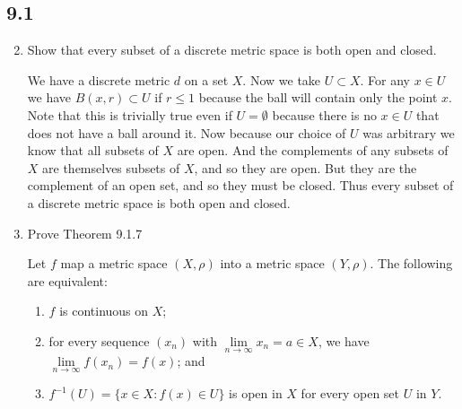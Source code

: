 \documentclass[letterpaper]{article}
\begin{document}
\renewcommand{\labelenumi}{\Alph{enumi}.}
\renewcommand{\labelenumii}{(\alph{enumii})}
\subsection*{9.1}
\begin{enumerate}
\setcounter{enumi}{1}
\item
Show that every subset of a discrete metric space is both open and closed.

We have a discrete metric $d$ on a set $X$. Now we take $U\subset X$. For any $x\in U$ we have $B(x,r)\subset U$ if $r\le 1$ because the ball will contain only the point $x$. Note that this is trivially true even if $U=\emptyset$ because there is no $x\in U$ that does not have a ball around it. Now because our choice of $U$ was arbitrary we know that all subsets of $X$ are open. And the complements of any subsets of $X$ are themselves subsets of $X$, and so they are open. But they are the complement of an open set, and so  they must be closed. Thus every subset of a discrete metric space is both open and closed.
\setcounter{enumi}{3}
\item
Prove Theorem 9.1.7

Let $f$ map a metric space $(X,\rho)$ into a metric space $(Y,\rho)$. The
following are equivalent:
\renewcommand{\labelenumii}{(\arabic{enumii})}
  \begin{enumerate}
    \item
    $f$ is continuous on $X$;
    \item
    for every sequence $(x_n)$ with $\lim\limits_{n\to\infty}x_n=a\in X$, we
    have $\lim\limits_{n\to\infty}f(x_n)=f(x)$; and
    \item
    $f^{-1}(U)=\{x\in X:f(x)\in U\}$ is open in $X$ for every open set $U$ in $Y$.
  \end{enumerate}


\end{enumerate}
\end{document}
